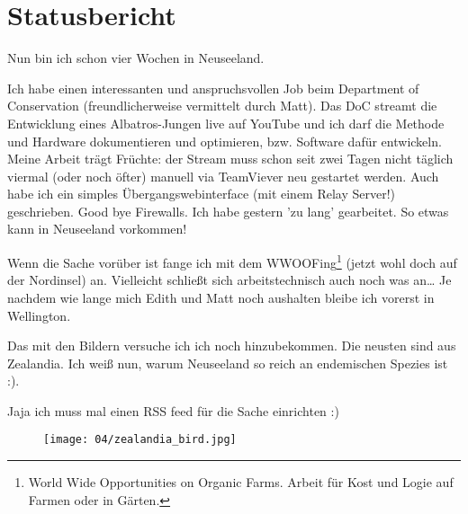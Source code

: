 \chapter{Statusbericht}

Nun bin ich schon vier Wochen in Neuseeland.

Ich habe einen interessanten und anspruchsvollen Job beim Department of
Conservation (freundlicherweise vermittelt durch Matt). Das DoC streamt
die Entwicklung eines Albatros-Jungen live auf YouTube und ich darf die
Methode und Hardware dokumentieren und optimieren, bzw. Software dafür
entwickeln. Meine Arbeit trägt Früchte: der Stream muss schon seit zwei
Tagen nicht täglich viermal (oder noch öfter) manuell via TeamViever neu
gestartet werden. Auch habe ich ein simples Übergangswebinterface (mit
einem Relay Server!) geschrieben. Good bye Firewalls. Ich habe gestern
'zu lang' gearbeitet. So etwas kann in Neuseeland vorkommen!


Wenn die Sache vorüber ist fange ich mit dem WWOOFing\footnote{World
Wide Opportunities on Organic Farms. Arbeit f\"ur Kost und Logie auf
Farmen oder in G\"arten.} (jetzt wohl doch auf der Nordinsel)
an. Vielleicht schließt sich arbeitstechnisch auch noch was an\ldots{}
Je nachdem wie lange mich Edith und Matt noch aushalten bleibe ich
vorerst in Wellington.

Das mit den Bildern versuche ich ich noch hinzubekommen. Die neusten
sind aus Zealandia. Ich weiß nun, warum Neuseeland so reich an
endemischen Spezies ist :).

Jaja ich muss mal einen RSS feed für die Sache einrichten :)

\begin{figure}[h]
  \centering
  \texttt{[image: 04/zealandia\_bird.jpg]}
\end{figure}
